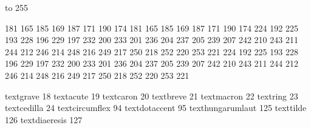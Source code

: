 

\startmapping[il2]

 to 255    %

 181 165    185 169
 187 171    190 174
 181 165    185 169
 187 171    190 174
 224 192    225 193
 228 196    229 197
 232 200    233 201
 236 204    237 205
 239 207    242 210
 243 211    244 212
 246 214    248 216
 249 217    250 218
 252 220    253 221
 224 192    225 193
 228 196    229 197
 232 200    233 201
 236 204    237 205
 239 207    242 210
 243 211    244 212
 246 214    248 216
 249 217    250 218
 252 220    253 221

\stopmapping

\startcoding[il2]

 textgrave          18
 textacute          19
 textcaron          20
 textbreve          21
 textmacron         22
 textring           23
 textcedilla        24
 textcircumflex     94
 textdotaccent      95
 texthungarumlaut  125
 texttilde         126
 textdiaeresis     127

